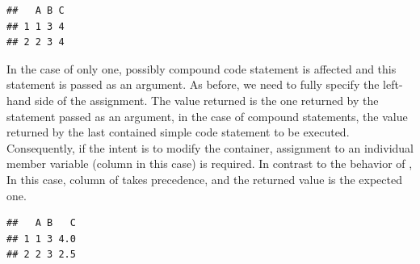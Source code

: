\documentclass[krantz2]{krantz}\usepackage{knitr}
\begin{document}
\begin{explainbox}
\begin{knitrout}\footnotesize
{}\color{fgcolor}\begin{kframe}
\begin{alltt}
\hlopt{$} \hlkwb{<-} 
\end{alltt}


{\ttfamily\noindent\itshape\color{messagecolor}{\#\# The following object is masked \_by\_ .GlobalEnv:\\\#\# \\\#\# \ \ \ \ A}}\begin{alltt}
\hlopt{$} \hlkwb{<-}  \hlopt{+}  \hlopt{/} 
 \hlstd{)}
\end{alltt}
\begin{verbatim}
##   A B C
## 1 1 3 4
## 2 2 3 4
\end{verbatim}
\end{kframe}
\end{knitrout}

In the case of  only one, possibly compound code statement is affected and this statement is passed as an argument. As before, we need to fully specify the left-hand side of the assignment. The value returned is the one returned by the statement passed as an argument, in the case of compound statements, the value returned by the last contained simple code statement to be executed. Consequently, if the intent is to modify the container, assignment to an individual member variable (column in this case) is required. In contrast to the behavior of , In this case, column  of  takes precedence, and the returned value is the expected one.

\begin{knitrout}\footnotesize
{}\color{fgcolor}\begin{kframe}
\begin{alltt}
\hlopt{$} \hlkwb{<-} 
\hlopt{$} \hlkwb{<-}  \hlopt{+}  \hlopt{/} 
 \hlstd{)}
\end{alltt}
\begin{verbatim}
##   A B   C
## 1 1 3 4.0
## 2 2 3 2.5
\end{verbatim}
\end{kframe}
\end{knitrout}


\end{explainbox}
\end{document}
